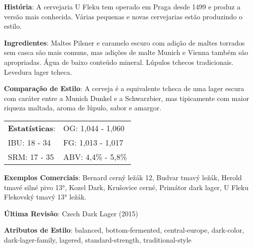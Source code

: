 \textbf{História}: A cervejaria U Fleku tem operado em Praga desde 1499 e produz a versão mais conhecida. Várias pequenas e novas cervejarias estão produzindo o estilo.

\textbf{Ingredientes}: Maltes Pilsner e caramelo escuro com adição de maltes torrados sem casca são mais comuns, mas adições de malte Munich e Vienna também são apropriadas. Água de baixo conteúdo mineral. Lúpulos tchecos tradicionais. Levedura lager tcheca.

\textbf{Comparação de Estilo}: A cerveja é a equivalente tcheca de uma lager escura com caráter entre a Munich Dunkel e a Schwarzbier, mas tipicamente com maior riqueza maltada, aroma de lúpulo, sabor e amargor.

\begin{tabular}{@{}p{35mm}p{35mm}@{}}
  \textbf{Estatísticas}: & OG: 1,044 - 1,060 \\
  IBU: 18 - 34  & FG: 1,013 - 1,017  \\
  SRM: 17 - 35   & ABV: 4,4\% - 5,8\%
\end{tabular}

\textbf{Exemplos Comerciais}: Bernard cerný ležák 12, Budvar tmavý ležák, Herold tmavé silné pivo 13°, Kozel Dark, Krušovice cerné, Primátor dark lager, U Fleku Flekovský tmavý 13° ležák.

\textbf{Última Revisão}: Czech Dark Lager (2015)

\textbf{Atributos de Estilo}: balanced, bottom-fermented, central-europe, dark-color, dark-lager-family, lagered, standard-strength, traditional-style